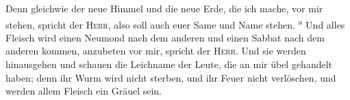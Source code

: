  Denn gleichwie der neue Himmel und die neue Erde, die
ich mache, vor mir stehen, spricht der \textsc{Herr}, also soll auch
euer Same und Name stehen. \textsuperscript{a}  Und alles
Fleisch wird einen Neumond nach dem anderen und einen Sabbat nach dem
anderen kommen, anzubeten vor mir, spricht der \textsc{Herr}.
 Und sie werden hinausgehen und schauen die Leichname der
Leute, die an mir übel gehandelt haben; denn ihr Wurm wird nicht
sterben, und ihr Feuer nicht verlöschen, und werden allem Fleisch ein
Gräuel sein.
